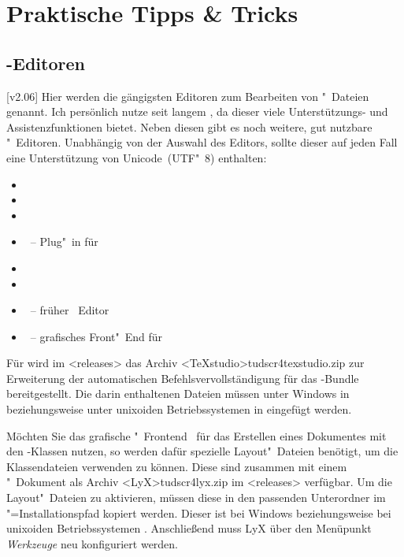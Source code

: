 \chapter{%
  Praktische Tipps \& Tricks%
  \label{sec:tips}%
}
\section{%
  -Editoren%
  \label{sec:tips:editor}%
}
%
[v2.06]%
Hier werden die gängigsten Editoren zum Bearbeiten von "~Dateien 
genannt. Ich persönlich nutze seit langem , da 
dieser viele Unterstützungs- und Assistenzfunktionen bietet. Neben diesen gibt 
es noch weitere, gut nutzbare "~Editoren. Unabhängig von der 
Auswahl des Editors, sollte dieser auf jeden Fall eine Unterstützung von 
Unicode~(UTF"~8) enthalten:
%
\begin{itemize}
\item {}
\item {}
\item {}
\item {}~-- Plug"~in für 
\item {}
\item {}
\item {}~-- früher ~Editor
\item {}~-- grafisches Front"~End für 
\end{itemize}
%
Für  wird im \GitHubRepo<releases> das Archiv 
\GitHubDownload<TeXstudio>{tudscr4texstudio.zip} zur Erweiterung der 
automatischen Befehlsvervollständigung für das \TUDScript-Bundle 
bereitgestellt. Die darin enthaltenen Dateien müssen unter Windows in 
 beziehungsweise unter unixoiden 
Betriebssystemen in  eingefügt werden.

Möchten Sie das grafische "~Frontend~ 
für das Erstellen eines Dokumentes mit den \TUDScript-Klassen nutzen, so werden 
dafür spezielle Layout"~Dateien benötigt, um die Klassendateien verwenden zu 
können. Diese sind zusammen mit einem "~Dokument als 
Archiv \GitHubDownload<LyX>{tudscr4lyx.zip} im \GitHubRepo<releases> 
verfügbar. Um die Layout"~Dateien zu aktivieren, müssen diese in den passenden 
Unterordner im "=Installationspfad kopiert werden. 
Dieser ist bei Windows
beziehungsweise bei unixoiden Betriebssystemen .
Anschließend muss LyX über den Menüpunkt \emph{Werkzeuge} neu konfiguriert 
werden. 




